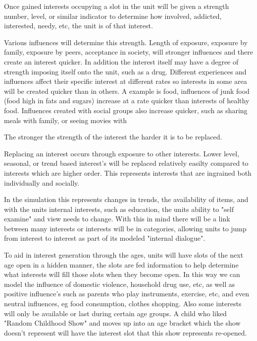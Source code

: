 Once gained interests occupying a slot in the unit will be given a strength number, level, or similar indicator to determine how involved, addicted, interested, needy, etc, the unit is of that interest. 

Various influences will determine this strength. Length of exposure, exposure by family, exposure by peers, acceptance in society, will stronger influences and there create an interest quicker. In addition the interest itself may have a degree of strength imposing itself onto the unit, such as a drug. Different experiences and influences affect their specific interest at different rates so interests in some area will be created quicker than in others. A example is food, influences of junk food (food high in fats and sugars) increase at a rate quicker than interests of healthy food. Influences created with social groups also increase quicker, such as sharing meals with family, or seeing movies with 



The stronger the strength of the interest the harder it is to be replaced.

Replacing an interest occurs through exposure to other interests. Lower level, seasonal, or trend based interest's will be replaced relatively easilty compared to interests which are higher order. This represents interests that are ingrained both individually and socially. 

In the simulation this represents changes in trends, the availability of items, and with the units internal interests, such as education, the units ability to "self examine" and view needs to change. With this in mind there will be a link between many interests or interests will be in categories, allowing units to jump from interest to interest as part of its modeled "internal dialogue".

To aid in interest generation through the ages, units will have slots of the next age open in a hidden manner, the slots are fed information to help determine what interests will fill those slots when they become open. In this way we can model the influence of domestic violence, household drug use, etc, as well as positive influence's such as parents who play instruments, exercise, etc, and even neutral influences, eg food consumption, clothes shopping. Also some interests will only be available or last during certain age groups. A child who liked "Random Childhood Show" and moves up into an age bracket which the show doesn't represent will have the interest slot that this show represents re-opened. 



